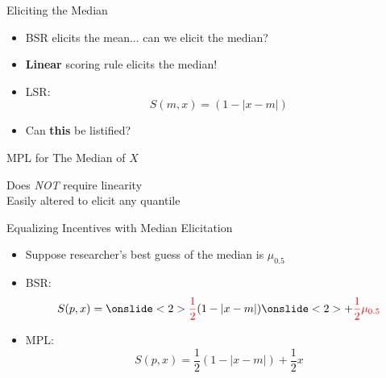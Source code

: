\begin{frame}{Eliciting the Median}
\begin{itemize}
    \item BSR elicits the mean... can we elicit the median?
    \item \textbf{Linear} scoring rule elicits the median!
    \item LSR: $$S(m,x) = (1-|x-m|) $$
    \item Can \textbf{this} be listified?
\end{itemize}
\end{frame}

\begin{frame}{MPL for The Median of $X$}
\begin{center}
    \br
    Does \textit{NOT} require linearity\\
    Easily altered to elicit any quantile
\end{center}
\end{frame}

\begin{frame}{Equalizing Incentives with Median Elicitation}
    \begin{itemize}
        \item Suppose researcher's best guess of the median is $\mu_{0.5}$
        \item BSR: $$S(p,x)=\onslide<2>{{\color{red}\frac{1}{2}}}(1-|x-m|)\onslide<2>{+\color{red}\frac{1}{2}\mu_{0.5}}$$
        \item MPL: $$S(p,x)=\frac{1}{2}(1-|x-m|) + \frac{1}{2}x$$
    \end{itemize}
\end{frame}


